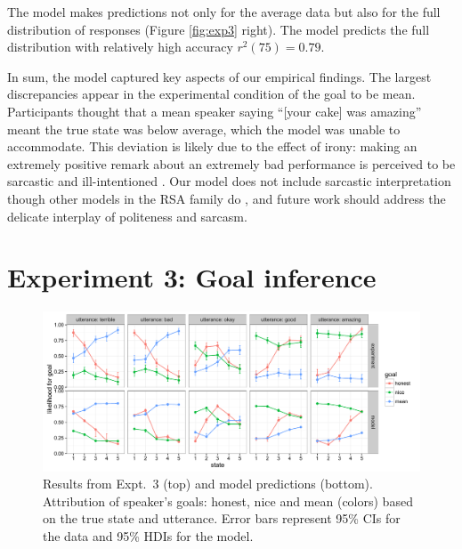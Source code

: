 \documentclass[10pt,letterpaper]{article}
\newcommand{\ndg}[1]{\textcolor{Green}{[ndg: #1]}}
\newcommand{\mht}[1]{\textcolor{DarkOrange}{[mht: #1]}}
\begin{document}
The model makes predictions not only for the average data but also for the full distribution of responses (Figure \ref{fig:exp3} right).
The model predicts the full distribution with relatively high accuracy $r^2(75) = 0.79$.

In sum, the model captured key aspects of our empirical findings.
The largest discrepancies appear in the experimental condition of the goal to be mean.
Participants thought that a mean speaker saying ``[your cake] was amazing'' meant the true state was below average, which the model was unable to accommodate.
This deviation is likely due to the effect of irony: making an extremely positive remark about an extremely bad performance is perceived to be sarcastic and ill-intentioned \cite{colston1997}.
Our model does not include sarcastic interpretation though other models in the RSA family do \cite{Kao2015}, and future work should address the delicate interplay of politeness and sarcasm.


\section{Experiment 3: Goal inference}


\begin{figure}[!t]
\begin{center}
  \includegraphics[width=\textwidth]{figures/exp2.pdf}
  \caption{\label{fig:exp2} Results from Expt.~3 (top) and model predictions (bottom). Attribution of speaker's goals: honest, nice and mean (colors) based on the true state and utterance. Error bars represent 95\% CIs for the data and 95\% HDIs for the model.}
  \end{center}
\end{figure}
\end{document}
